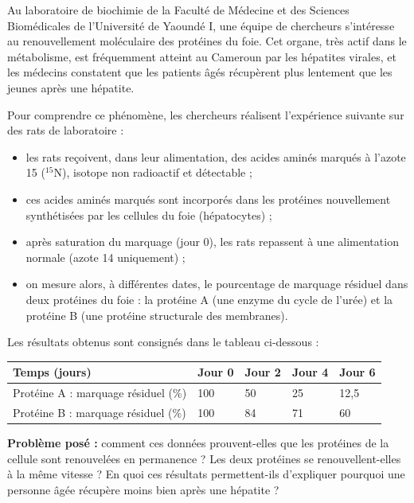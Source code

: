 \documentclass[11pt]{article}
\newcommand{\cle}[1]{{\popxbold\color{popdark}#1}}
\newcounter{popsec}
\newcounter{popsub}
\newcommand{\courssub}[1]{%
  \stepcounter{popsub}%
  \par\vspace{9pt}\noindent{\popxbold\fontsize{11.5}{13}\selectfont\color{popink}{\color{poporange}\thepopsec.\thepopsub}\hspace{6pt}#1}\par\nopagebreak\vspace{4pt}
}
\begin{document}
\courssub{Situation}

Au laboratoire de biochimie de la Faculté de Médecine et des Sciences Biomédicales de l'Université de Yaoundé I, une équipe de chercheurs s'intéresse au \cle{renouvellement moléculaire} des protéines du foie. Cet organe, très actif dans le métabolisme, est fréquemment atteint au Cameroun par les hépatites virales, et les médecins constatent que les patients âgés récupèrent plus lentement que les jeunes après une hépatite.

Pour comprendre ce phénomène, les chercheurs réalisent l'expérience suivante sur des rats de laboratoire :
\begin{itemize}
\item les rats reçoivent, dans leur alimentation, des \cle{acides aminés marqués} à l'azote 15 ($^{15}$N), isotope non radioactif et détectable ;
\item ces acides aminés marqués sont incorporés dans les protéines nouvellement synthétisées par les cellules du foie (hépatocytes) ;
\item après saturation du marquage (jour 0), les rats repassent à une alimentation normale (azote 14 uniquement) ;
\item on mesure alors, à différentes dates, le \cle{pourcentage de marquage résiduel} dans deux protéines du foie : la protéine A (une enzyme du cycle de l'urée) et la protéine B (une protéine structurale des membranes).
\end{itemize}

Les résultats obtenus sont consignés dans le tableau ci-dessous :

\begin{center}
\begin{tabularx}{\linewidth}{|l|X|X|X|X|}
\hline
\rowcolor{popblue!40} \textbf{Temps (jours)} & \textbf{Jour 0} & \textbf{Jour 2} & \textbf{Jour 4} & \textbf{Jour 6} \\
\hline
Protéine A : marquage résiduel (\%) & 100 & 50 & 25 & 12,5 \\
\hline
Protéine B : marquage résiduel (\%) & 100 & 84 & 71 & 60 \\
\hline
\end{tabularx}
\end{center}

\textbf{Problème posé :} comment ces données prouvent-elles que les protéines de la cellule sont renouvelées en permanence ? Les deux protéines se renouvellent-elles à la même vitesse ? En quoi ces résultats permettent-ils d'expliquer pourquoi une personne âgée récupère moins bien après une hépatite ?
\end{document}
